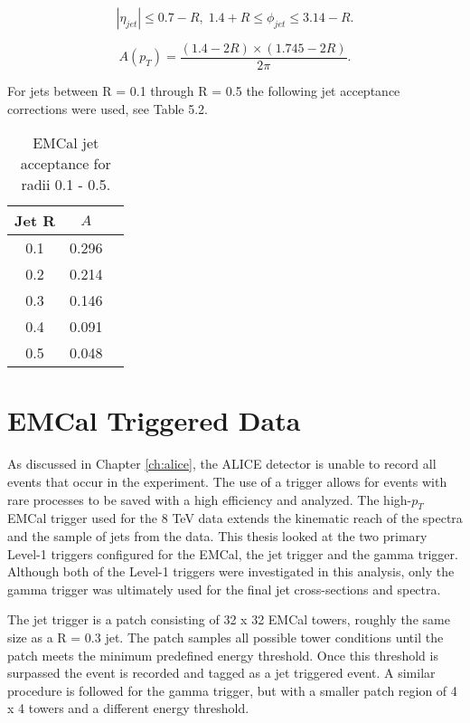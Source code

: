 \begin{equation}
|\eta_{jet}| \leq 0.7 - R, \; 1.4 + R \leq \phi_{jet} \leq 3.14 -R.
\label{eq:jetconstration}
\end{equation}

\begin{equation}
A(p_{T}) = \frac{(1.4 - 2R) \times (1.745 - 2R)}{2 \pi}.
\label{eq:acceptance}
\end{equation}

For jets between R = 0.1 through R = 0.5 the following jet acceptance corrections were used, see Table 5.2.

\begin{table}[hb]
\label{tab:AcceptanceFactor}
\begin{center}
\caption{EMCal jet acceptance for radii 0.1 - 0.5.}
\begin{tabular}[b]{|c|c|c|}
	\hline
	Jet R & $ A $ \\ \hline
	0.1 & 0.296 \\ \hline
	0.2 & 0.214\\ \hline
	0.3 & 0.146\\ \hline
	0.4 & 0.091\\ \hline
	0.5 & 0.048\\ \hline
\end{tabular}
\end{center}

\end{table}

\section{EMCal Triggered Data}

As discussed in Chapter \ref{ch:alice}, the ALICE detector is unable to record all events that occur in the experiment.   The use of a trigger allows for events with rare processes to be saved with a high efficiency and analyzed.  The high-$p_{T}$ EMCal trigger used for the 8 TeV data extends the kinematic reach of the spectra and the sample of jets from the data.  This thesis looked at the two primary Level-1 triggers configured for the EMCal, the jet trigger and the gamma trigger\cite{Bourrion:2010js}.  Although both of the Level-1 triggers were investigated in this analysis, only the gamma trigger was ultimately used for the final jet cross-sections and spectra.  

The jet trigger is a patch consisting of 32 x 32 EMCal towers, roughly the same size as a R = 0.3 jet.  The patch samples all possible tower conditions until the patch meets the minimum predefined energy threshold.  Once this threshold is surpassed the event is recorded and tagged as a jet triggered event.  A similar procedure is followed for the gamma trigger, but with a smaller patch region of 4 x 4 towers and a different energy threshold.  


